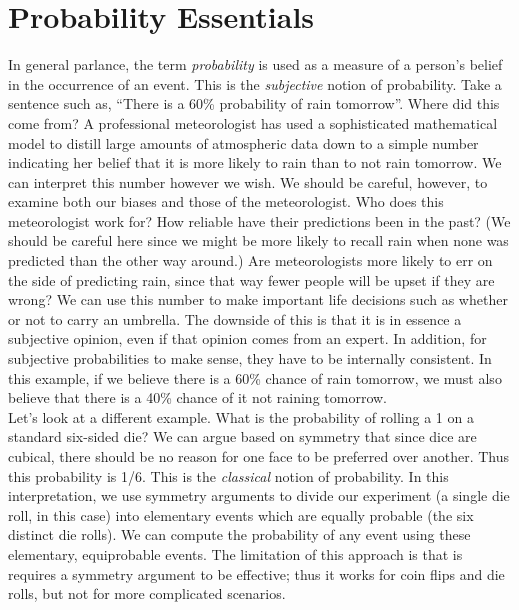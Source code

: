 \documentclass[12pt]{article}
\theoremstyle{definition}
\theoremstyle{remark}
\begin{document}
\section{Probability Essentials}
In general parlance, the term \emph{probability} is used as a measure of a person's belief in the occurrence of an event. This is the \emph{subjective} notion of probability. Take a sentence such as, ``There is a 60\% probability of rain tomorrow''. Where did this come from? A professional meteorologist has used a sophisticated mathematical model to distill large amounts of atmospheric data down to a simple number indicating her belief that it is more likely to rain than to not rain tomorrow. We can interpret this number however we wish. We should be careful, however, to examine both our biases and those of the meteorologist. Who does this meteorologist work for? How reliable have their predictions been in the past? (We should be careful here since we might be more likely to recall rain when none was predicted than the other way around.) Are meteorologists more likely to err on the side of predicting rain, since that way fewer people will be upset if they are wrong? We can use this number to make important life decisions such as whether or not to carry an umbrella. The downside of this is that it is in essence a subjective opinion, even if that opinion comes from an expert. In addition, for subjective probabilities to make sense, they have to be internally consistent. In this example, if we believe there is a 60\% chance of rain tomorrow, we must also believe that there is a 40\% chance of it not raining tomorrow.
\\

Let's look at a different example. What is the probability of rolling a 1 on a standard six-sided die? We can argue based on symmetry that since dice are cubical, there should be no reason for one face to be preferred over another. Thus this probability is 1/6. This is the \emph{classical} notion of probability. In this interpretation, we use symmetry arguments to divide our experiment (a single die roll, in this case) into elementary events which are equally probable (the six distinct die rolls). We can compute the probability of any event using these elementary, equiprobable events. The limitation of this approach is that is requires a symmetry argument to be effective; thus it works for coin flips and die rolls, but not for more complicated scenarios.\\
\end{document}
